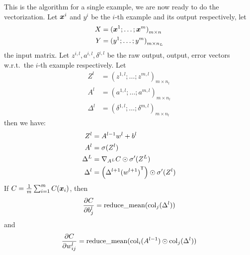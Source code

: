 This is the algorithm for a single example, we are now ready to do the vectorization. Let $\boldsymbol{x}^i$ and $y^i$
be the $i$-th example and its output respectively, let
\begin{align*}
    X &= {(\boldsymbol{x}^1; \ldots; \boldsymbol{x}^m)}_{m \times n}\\
    Y &= {(y^1; \ldots; y^m)}_{m \times n_L}
\end{align*}
the input matrix. 
Let $z^{i, l}, a^{i, l}, \delta^{i, l}$ be the raw output, output, error vectors w.r.t.\ the
$i$-th example respectively. Let 
\begin{align*}
    Z^l &= {(z^{1, l}; \ldots; z^{m, l})}_{m \times n_l}\\
    A^l &= {(a^{1, l}; \ldots; a^{m, l})}_{m \times n_l}\\
    \Delta^l &= {(\delta^{1, l}; \ldots; \delta^{m, l})}_{m \times n_l}
\end{align*}
then we have:
\begin{align}
    Z^l &= A^{l-1} w^l + b^l\\
    A^l &= \sigma(Z^l)\\
    \Delta^L &= \nabla_{A^L}C \odot \sigma'(Z^L)\\
    \Delta^l &= \left(\Delta^{l+1} {(w^{l+1})}^\mathsf{T}\right) \odot \sigma'(Z^l)
\end{align}
If $C = \frac{1}{m}\sum_{i=1}^m C(\boldsymbol{x}_i)$, then
$$\frac{\partial {C}}{\partial {b^l_j}} = \operatorname{reduce\_mean}(\operatorname{col}_j(\Delta^l))$$
and
$$\frac{\partial {C}}{\partial {w^l_{ij}}} = \operatorname{reduce\_mean}(\operatorname{col}_i(A^{l-1}) \odot \operatorname{col}_j
(\Delta^l))$$